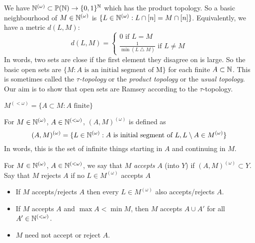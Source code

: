 \documentclass[a4paper]{article}
\newcommand{\Nomega}{\N^{(\omega)}}
\newcommand{\Momega}{M^{(\omega)}}
\newcommand{\Nfinite}{\N^{(< \omega)}}
\newcommand{\Mfinite}{M^{(< \omega)}}
\begin{document}
  We have $\Nomega \subset \P(\N) \to \{0,1\}^{\N}$ which has the product
  topology. So a basic neighbourhood of $M \in \Nomega$ is $\{L \in \Nomega : L
  \cap [n] = M \cap [n]\}$. Equivalently, we have a metric $d(L,M)$:
  \[d(L,M) =
    \begin{cases}
      0 \text{ if } L = M \\
      \frac{1}{\min{(L \bigtriangleup M)}} \text{ if } L \neq M
    \end{cases}
  \]
  In words, two sets are close if the first element they disagree on is large.  
  So the basic open sets are $\{M : A \text{ is an initial segment of M}\}$ for
  each finite $A \subset \mathbb{N}$. This is sometimes called the
  \textit{$\tau$-topology} or the \textit{product
    topology} or the \textit{usual topology}. Our aim is to show that open sets are Ramsey according to the
  $\tau$-topology.
  \begin{defi}[$\Mfinite$]\index{$\Mfinite$}
    $\Mfinite = \{A \subset M : A \text{ finite}\}$
  \end{defi}
  \begin{defi}[$(A,M)^{(\omega)}$]
    For $M \in \Nomega$, $A \in \Nfinite$, $(A,M)^{(\omega)}$ is defined as
    \[(A,M)^{(\omega)} = \{L \in \Nomega : A \text{ is initial segment of }L, L
      \setminus A \in \Momega \}\]
    In words, this is the set of infinite things starting in $A$ and continuing
    in $M$.
  \end{defi}
  \begin{defi}
    For $M \in \Nomega$, $A \in \Nfinite$, we say that $M$ \textit{accepts} $A$
    (into $Y$) if $(A,M)^{(\omega)} \subset Y$. Say that $M$ rejects $A$ if no
    $L \in \Momega$ accepts $A$ 
  \end{defi}
  \begin{remarks}
    \begin{itemize}
    \item If $M$ accepts/rejects $A$ then every $L \in \Momega$ also
      accepts/rejects $A$.
    \item If $M$ accepts $A$ and $\max A < \min M$, then $M$ accepts $A \cup
      A'$ for all $A' \in \Nfinite$.
    \item $M$ need not accept or reject $A$.
    \end{itemize}
  \end{remarks}
\end{document}
